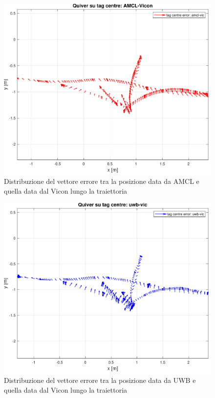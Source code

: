 \begin{figure}[] 
	\centering    
	\includegraphics[height=.3\textheight]{grafici_stanzavolo_vicon/figure21.pdf}
	\caption{Distribuzione del vettore errore tra la posizione data da AMCL e quella data dal Vicon lungo la traiettoria}
	\label{fig: quiver_err_amclvic_vicon_charlie}
\end{figure}

\begin{figure}[] 
	\centering    
	\includegraphics[height=.3\textheight]{grafici_stanzavolo_vicon/figure20.pdf}
	\caption{Distribuzione del vettore errore tra la posizione data da UWB e quella data dal Vicon lungo la traiettoria}
	\label{fig: quiver_err_uwbvic_vicon_charlie}
\end{figure}

